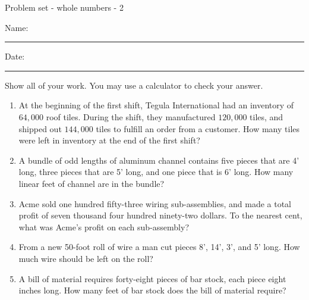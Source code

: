 \documentclass[12pt]{article}
\begin{document}
\pagestyle{empty} %
\begin{center}
          Problem set - whole numbers - 2 \\[0.5in]
\end{center}
Name: \rule{4in}{0.005in} Date: \rule{1.5in}{0.005in} 
  \vspace{0.25in}

Show all of your work. You may use a calculator to check your answer. 

\begin{enumerate}

\item At the beginning of the first shift, Tegula International had an inventory of $64,000$ roof tiles. During the shift, they manufactured $120,000$ tiles, and shipped out $144,000$ tiles to fulfill an order from a customer. How many tiles were left in inventory at the end of the first shift?  
  \vspace{0.5in}
  \vspace{0.5in}

\item A bundle of odd lengths of aluminum channel contains five pieces that are 4' long, three pieces that are 5' long, and one piece that is 6' long. How many linear feet of channel are in the bundle?
  \vspace{0.5in}
  \vspace{0.5in}

\item Acme sold one hundred fifty-three wiring sub-assemblies, and made a total profit of seven thousand four hundred ninety-two dollars. To the nearest cent, what was Acme's profit on each sub-assembly?
  \vspace{0.5in}
  \vspace{0.5in}
  \vspace{0.5in}

\item From a new 50-foot roll of wire a man cut pieces 8', 14', 3', and 5' long. How much wire should be left on the roll? 
  \vspace{0.5in}
  \vspace{0.5in}

\item A bill of material requires forty-eight pieces of bar stock, each piece eight inches long. How many feet of bar stock does the bill of material require? 
  \vspace{0.5in}
  \vspace{0.5in}


\end{enumerate}
\end{document}
